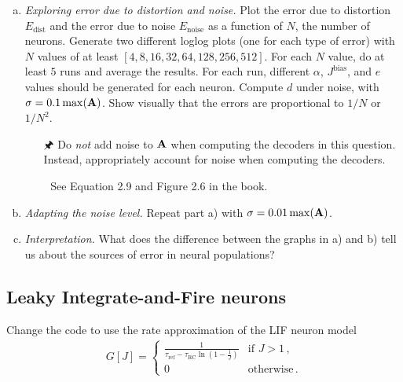 	\begin{enumerate}[a)]
		\item {} \textit{Exploring error due to distortion and noise.} Plot the error due to distortion $E_\mathrm{dist}$ and the error due to noise $E_\mathrm{noise}$ as a function of $N$, the number of neurons. Generate two different loglog plots (one for each type of error) with $N$ values of at least $[4, 8, 16, 32, 64, 128, 256, 512]$. For each $N$ value, do at least $5$ runs and average the results. For each run, different $\alpha$, $J^\mathrm{bias}$, and $e$ values should be generated for each neuron. Compute $d$ under noise, with $\sigma = 0.1 \max({\mathbf{A}})$. Show visually that the errors are proportional to $1/N$ or $1/N^2$.
		\begin{itemize}
			\item[{\symbolfont 🖈}] Do \textit{not} add noise to ${\mathbf{A}}$ when computing the decoders in this question. Instead, appropriately account for noise when computing the decoders.
			\item[{\symbolfont 📖}] See Equation 2.9 and Figure 2.6 in the book.
		\end{itemize}
		\item {} \textit{Adapting the noise level.} Repeat part a) with $\sigma = 0.01 \max({\mathbf{A}})$.
		\item {} \textit{Interpretation.} What does the difference between the graphs in a) and b) tell us about the sources of error in neural populations?
	\end{enumerate}

	\subsection{Leaky Integrate-and-Fire neurons}

	Change the code to use the rate approximation of the LIF neuron model
	\begin{align*}
		G[J] = \begin{cases} {\frac{1}{\tau_\mathrm{ref}-\tau_\mathrm{RC}\ln(1-\frac{1}J)}} &\mbox{if } J > 1 \,, \\ 0 &\mbox{otherwise} \,.\end{cases}
	\end{align*}

